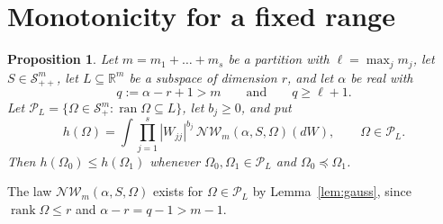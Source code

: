\documentclass{amsart}
\newtheorem{proposition}[theorem]{Proposition}
\theoremstyle{definition}
\theoremstyle{remark}
\numberwithin{equation}{section}
\newcommand{\R}{\mathbb{R}}
\newcommand{\Sym}{\mathcal{S}}
\newcommand{\NW}{\mathcal{N}\!\mathcal{W}}
\newcommand{\ran}{\operatorname{ran}}
\newcommand{\rank}{\operatorname{rank}}
\begin{document}
\section{Monotonicity for a fixed range}\label{sec:support}

\begin{proposition}\label{prop:support}
Let $m=m_1+\dots+m_s$ be a partition with $\ell=\max_jm_j$, let $S\in\Sym^m_{++}$, let $L\subseteq\R^m$ be a subspace of dimension $r$, and let $\alpha$ be real with
\begin{equation}\label{eq:qcond}
q:=\alpha-r+1>m\qquad\text{and}\qquad q\ge\ell+1 .
\end{equation}
Let $\mathcal P_L=\{\Omega\in\Sym^m_+:\ran\Omega\subseteq L\}$, let $b_j\ge0$, and put
\[
h(\Omega)=\int\prod_{j=1}^s|W_{jj}|^{b_j}\,\NW_m(\alpha,S,\Omega)(dW),\qquad\Omega\in\mathcal P_L .
\]
Then $h(\Omega_0)\le h(\Omega_1)$ whenever $\Omega_0,\Omega_1\in\mathcal P_L$ and $\Omega_0\preceq\Omega_1$.
\end{proposition}

The law $\NW_m(\alpha,S,\Omega)$ exists for $\Omega\in\mathcal P_L$ by Lemma~\ref{lem:gauss}, since $\rank\Omega\le r$ and $\alpha-r=q-1>m-1$.
\end{document}
